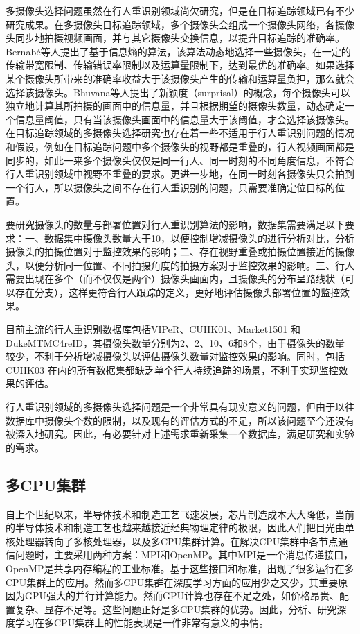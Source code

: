 多摄像头选择问题虽然在行人重识别领域尚欠研究，但是在目标追踪领域已有不少研究成果。在多摄像头目标追踪领域，多个摄像头会组成一个摄像头网络，各摄像头同步地拍摄视频画面，并与其它摄像头交换信息，以提升目标追踪的准确率。Bernab{\'e}等人\cite{de2012entropy}提出了基于信息熵的算法，该算法动态地选择一些摄像头，在一定的传输带宽限制、传输错误率限制以及运算量限制下，达到最优的准确率。如果选择某个摄像头所带来的准确率收益大于该摄像头产生的传输和运算量负担，那么就会选择该摄像头。Bhuvana等人\cite{bhuvana2016multi}提出了新颖度（surprisal）的概念，每个摄像头可以独立地计算其所拍摄的画面中的信息量，并且根据期望的摄像头数量，动态确定一个信息量阈值，只有当该摄像头画面中的信息量大于该阈值，才会选择该摄像头。在目标追踪领域的多摄像头选择研究也存在着一些不适用于行人重识别问题的情况和假设，例如在目标追踪问题中多个摄像头的视野都是重叠的，行人视频画面都是同步的，如此一来多个摄像头仅仅是同一行人、同一时刻的不同角度信息，不符合行人重识别领域中视野不重叠的要求。更进一步地，在同一时刻各摄像头只会拍到一个行人，所以摄像头之间不存在行人重识别的问题，只需要准确定位目标的位置。

要研究摄像头的数量与部署位置对行人重识别算法的影响，数据集需要满足以下要求：一、数据集中摄像头数量大于10，以便控制增减摄像头的进行分析对比，分析摄像头的拍摄位置对于监控效果的影响；二、存在视野重叠或拍摄位置接近的摄像头，以便分析同一位置、不同拍摄角度的拍摄方案对于监控效果的影响。三、行人需要出现在多个（而不仅仅是两个）摄像头画面内，且摄像头的分布呈路线状（可以存在分支），这样更符合行人跟踪的定义，更好地评估摄像头部署位置的监控效果。

目前主流的行人重识别数据库包括VIPeR\cite{gray2007evaluating}、CUHK01\cite{li2012human}、Market1501\cite{zheng2015scalable} 和 DukeMTMC4reID\cite{ristani2016MTMC}，其摄像头数量分别为2、2、10、6和8个，由于摄像头的数量较少，不利于分析增减摄像头以评估摄像头数量对监控效果的影响。同时，包括 CUHK03\cite{li2014deepreid} 在内的所有数据集都缺乏单个行人持续追踪的场景，不利于实现监控效果的评估。

行人重识别领域的多摄像头选择问题是一个非常具有现实意义的问题，但由于以往数据库中摄像头个数的限制，以及现有的评估方式的不足，所以该问题至今还没有被深入地研究。因此，有必要针对上述需求重新采集一个数据库，满足研究和实验的需求。

\subsection{多CPU集群}

自上个世纪以来，半导体技术和制造工艺飞速发展，芯片制造成本大大降低，当前的半导体技术和制造工艺也越来越接近经典物理定律的极限，因此人们把目光由单核处理器转向了多核处理器，以及多CPU集群计算。在解决CPU集群中各节点通信问题时，主要采用两种方案：MPI\cite{sur2006high}和OpenMP\cite{dagum1998openmp}。其中MPI是一个消息传递接口，OpenMP是共享内存编程的工业标准。基于这些接口和标准，出现了很多运行在多CPU集群上的应用\cite{rabenseifner2009hybrid,ayguade2009design}。然而多CPU集群在深度学习方面的应用少之又少，其重要原因为GPU强大的并行计算能力。然而GPU计算也存在不足之处，如价格昂贵、配置复杂、显存不足等。这些问题正好是多CPU集群的优势。因此，分析、研究深度学习在多CPU集群上的性能表现是一件非常有意义的事情。

